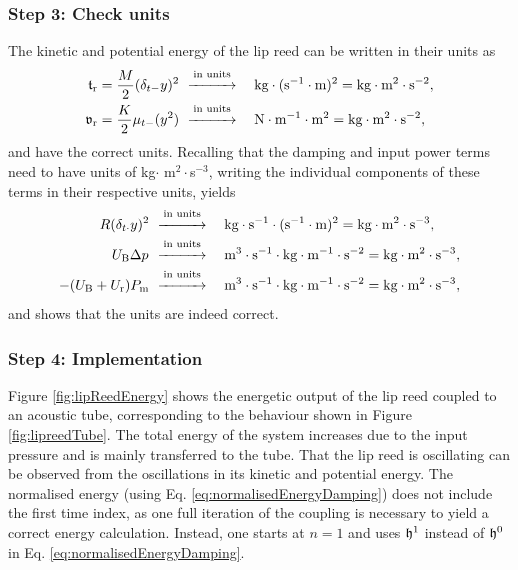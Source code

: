 \subsubsection{Step 3: Check units}
The kinetic and potential energy of the lip reed can be written in their units as
\begin{align*}
    \mathfrak{t}_{\text{r}} = \frac{M}{2}(\delta_{t-}y)^2 &\ \overset{\text{in units}}{\xrightarrow{\hspace*{1cm}}} \quad\text{kg}\cdot(\text{s}^{-1}\cdot \text{m})^{2}= \text{kg}\cdot\text{m}^2\cdot\text{s}^{-2},\\
    \mathfrak{v}_{\text{r}} = \frac{K}{2}\mu_{t-}(y^2)&\ \overset{\text{in units}}{\xrightarrow{\hspace*{1cm}}} \quad \text{N} \cdot \text{m}^{-1} \cdot \text{m}^2 = \text{kg}\cdot\text{m}^2\cdot\text{s}^{-2},
\end{align*}
and have the correct units. Recalling that the damping and input power terms need to have units of kg$\cdot$ m$^2 \cdot $s$^{-3}$, writing the individual components of these terms in their respective units, yields
\begin{align*}
    R(\delta_{t\cdot} y)^2 &\ \overset{\text{in units}}{\xrightarrow{\hspace*{1cm}}} \quad\text{kg}\cdot\text{s}^{-1}\cdot(\text{s}^{-1}\cdot \text{m})^{2} = \text{kg} \cdot \text{m}^2 \cdot \text{s}^{-3} ,\\
    U_\text{B}\Delta p^{}&\ \overset{\text{in units}}{\xrightarrow{\hspace*{1cm}}} \quad \text{m}^3 \cdot \text{s}^{-1}\cdot \text{kg}\cdot \text{m}^{-1}\cdot \text{s}^{-2}= \text{kg} \cdot \text{m}^2 \cdot \text{s}^{-3},\\
    -(U_{\text{B}} + U_{\text{r}})P_{\text{m}}&\ \overset{\text{in units}}{\xrightarrow{\hspace*{1cm}}} \quad \text{m}^3 \cdot \text{s}^{-1}\cdot \text{kg}\cdot \text{m}^{-1}\cdot \text{s}^{-2}= \text{kg} \cdot \text{m}^2 \cdot \text{s}^{-3},
\end{align*}
and shows that the units are indeed correct.
\subsubsection{Step 4: Implementation}
Figure \ref{fig:lipReedEnergy} shows the energetic output of the lip reed coupled to an acoustic tube, corresponding to the behaviour shown in Figure \ref{fig:lipreedTube}. The total energy of the system increases due to the input pressure and is mainly transferred to the tube. That the lip reed is oscillating can be observed from the oscillations in its kinetic and potential energy. The normalised energy (using Eq. \eqref{eq:normalisedEnergyDamping}) does not include the first time index, as one full iteration of the coupling is necessary to yield a correct energy calculation. Instead, one starts at $n=1$ and uses $\mathfrak{h}^1$ instead of $\mathfrak{h}^0$ in Eq. \eqref{eq:normalisedEnergyDamping}. 

